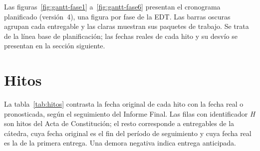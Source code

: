 Las figuras~\ref{fig:gantt-fase1} a~\ref{fig:gantt-fase6} presentan el cronograma planificado (versión~4), una figura por fase de la EDT. Las barras oscuras agrupan cada entregable y las claras muestran sus paquetes de trabajo. Se trata de la línea base de planificación; las fechas reales de cada hito y su desvío se presentan en la sección siguiente.








\section{Hitos}

La tabla~\ref{tab:hitos} contrasta la fecha original de cada hito con la fecha real o pronosticada, según el seguimiento del Informe Final. Las filas con identificador \emph{H} son hitos del Acta de Constitución; el resto corresponde a entregables de la cátedra, cuya fecha original es el fin del período de seguimiento y cuya fecha real es la de la primera entrega. Una demora negativa indica entrega anticipada.

